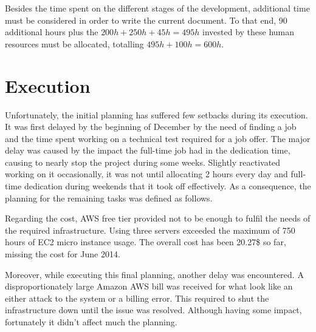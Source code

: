 Besides the time spent on the different stages of the development, additional time must be considered in order to write the current document. To that end, 90 additional hours plus the $200h + 250h + 45h = 495h$ invested by these human resources must be allocated, totalling $495h + 100h = 600h$.

\section{Execution}

Unfortunately, the initial planning has suffered few setbacks during its execution. It was first delayed by the beginning of December by the need of finding a job and the time spent working on a technical test required for a job offer. The major delay was caused by the impact the full-time job had in the dedication time, causing to nearly stop the project during some weeks. Slightly      reactivated working on it occasionally, it was not until allocating 2 hours every day and full-time dedication during weekends that it took off effectively. As a consequence, the planning for the remaining tasks was defined as follows.

Regarding the cost, AWS free tier provided not to be enough to fulfil the needs of the required infrastructure. Using three servers exceeded the maximum of 750 hours of EC2 micro instance usage. The overall cost has been 20.27\$ so far, missing the cost for June 2014.

Moreover, while executing this final planning, another delay was encountered. A disproportionately large Amazon AWS bill was received for what look like an either attack to the system or a billing error. This required to shut the infrastructure down until the issue was resolved. Although having some impact, fortunately it didn't affect much the planning.

